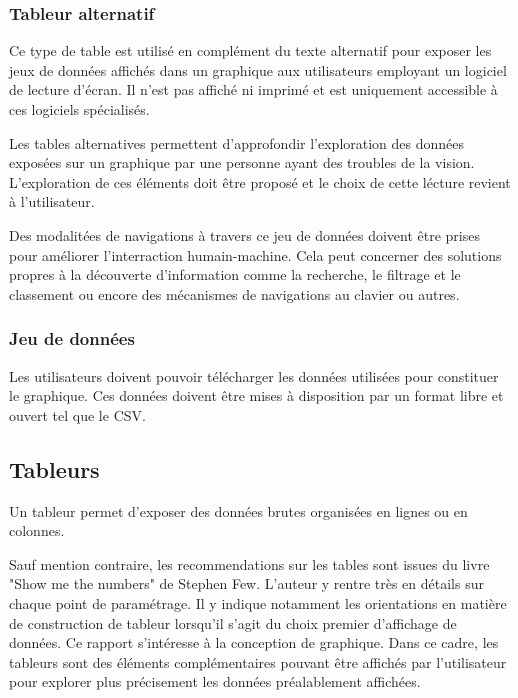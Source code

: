 \documentclass[a4paper,12pt]{article}
\begin{document}
\begin{multicols}{2}
\subsubsection*{Tableur alternatif}
\label{sec:org0bce522}
Ce type de table est utilisé en complément du texte alternatif pour exposer les jeux de données affichés dans un graphique aux utilisateurs employant un logiciel de lecture d'écran. Il n'est pas affiché ni imprimé et est uniquement accessible à ces logiciels spécialisés.

Les tables alternatives permettent d'approfondir l'exploration des données exposées sur un graphique par une personne ayant des troubles de la vision. L'exploration de ces éléments doit être proposé et le choix de cette lécture revient à l'utilisateur. \autocite{sarahfossheimCreatingBetterScreen2022}

Des modalitées de navigations à travers ce jeu de données doivent être prises pour améliorer l'interraction humain-machine. Cela peut concerner des solutions propres à la découverte d'information comme la recherche, le filtrage et le classement ou encore des mécanismes de navigations au clavier ou autres. \autocite{sarahfossheimCreatingBetterScreen2022}
\subsubsection*{Jeu de données}
\label{sec:org9c50f5a}
Les utilisateurs doivent pouvoir télécharger les données utilisées pour constituer le graphique. Ces données doivent être mises à disposition par un format libre et ouvert tel que le CSV. \autocite{frankelavskyRightToolsJob2022}
\subsection*{Tableurs}
\label{sec:org09fb68f}
Un tableur permet d'exposer des données brutes organisées en lignes ou en colonnes. \autocite{mikeyiHowChooseRight2020}

Sauf mention contraire, les recommendations sur les tables sont issues du livre "Show me the numbers" de Stephen Few.\autocite{stephenfewShowMeNumbers2012} L'auteur y rentre très en détails sur chaque point de paramétrage. Il y indique notamment les orientations en matière de construction de tableur lorsqu'il s'agit du choix premier d'affichage de données. Ce rapport s'intéresse à la conception de graphique. Dans ce cadre, les tableurs sont des éléments complémentaires pouvant être affichés par l'utilisateur pour explorer plus précisement les données préalablement affichées.


\end{multicols}
\end{document}
